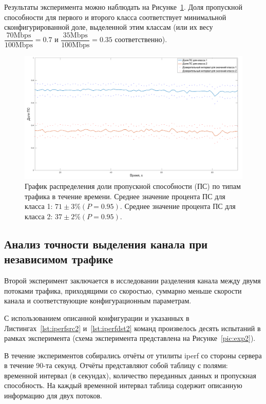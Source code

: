 			Результаты эксперимента можно наблюдать на Рисунке~\ref{pic:plot}. Доля пропускной
			способности для первого и второго класса соответствует минимальной сконфигурированной доле, выделенной
			этим классам (или их весу $\dfrac{\text{70Mbps}}{\text{100Mbps}} = 0.7$ и
            $\dfrac{\text{35Mbps}}{\text{100Mbps}} = 0.35$ соответственно). 

            \begin{figure}[ht!]
            	\center
            	\includegraphics[width=1\linewidth]{./plotc.png} %
            	\caption{График распределения доли пропускной способности (ПС) по типам трафика в течение времени.
						 Среднее значение процента ПС для класса 1: $71 \pm 3 \% (P = 0.95)$.
                         Среднее значение процента ПС для класса 2: $37 \pm 2 \% (P = 0.95)$.
                        }
    			\label{pic:plot}
            \end{figure}

		\subsection{Анализ точности выделения канала при независимом трафике}

			Второй эксперимент заключается в исследовании разделения канала между
			двумя потоками трафика, приходящими со скоростью, суммарно меньше
			скорости канала и соответствующие конфигурационным параметрам.

    		С использованием описанной конфигурации и указанных в Листингах~\ref{lst:iperfsrc2} и~\ref{lst:iperfdst2}
			команд произвелось десять испытаний в рамках эксперимента (схема
			эксперимента представлена на Рисунке~\ref{pic:exp2}).

    		В течение экспериментов собирались отчёты от утилиты iperf со стороны сервера в
    		течение 90-та секунд. Отчёты представляют собой таблицу с полями:
			временной интервал (в секундах), количество переданных данных и пропускная способность.
			На каждый временной интервал таблица содержит описанную информацию для двух потоков.


